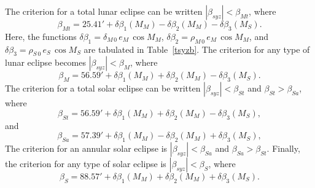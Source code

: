 The criterion for a total lunar eclipse can be written $|\beta_{syz}|< \beta_{Mt}$, where
\begin{equation}\label{elt}
\beta_{Mt} = 25.41' + \delta\beta_1(M_M)-\delta\beta_2 (M_M)-\delta\beta_3(M_S).\label{ae137}
\end{equation}
Here, the functions $\delta\beta_1=\delta_{M\,0}\,e_M\,\cos M_M$, $\delta\beta_2= \rho_{M\,0}\,e_M\,\cos M_M$, and $\delta\beta_3=\rho_{S\,0}\,e_S\,\cos M_S$
are tabulated in Table~\ref{tsyzb}. The criterion for any type of
lunar eclipse becomes $|\beta_{syz}|< \beta_{M}$, where
\begin{equation}\label{elp}
\beta_{M} = 56.59' +  \delta\beta_1(M_M)+\delta\beta_2 (M_M)-\delta\beta_3(M_S).
\end{equation}
The criterion for a total  solar eclipse can
be written $|\beta_{syz}|<\beta_{St}$ and $\beta_{St}>\beta_{Sa}$, where
\begin{equation}\label{est}
\beta_{St} = 56.59' +  \delta\beta_1(M_M)+\delta\beta_2 (M_M)-\delta\beta_3(M_S),
\end{equation}
and
\begin{equation}\label{esa}
\beta_{Sa} = 57.39' +  \delta\beta_1(M_M)-\delta\beta_2 (M_M)+\delta\beta_3(M_S),
\end{equation}
The criterion for an annular  solar eclipse is $|\beta_{syz}|<\beta_{Sa}$ and $\beta_{Sa}>\beta_{St}$.
Finally, 
the criterion for any
type of solar eclipse is $|\beta_{syz}|< \beta_{S}$, where
\begin{equation}\label{esp}
\beta_{S} = 88.57' +  \delta\beta_1(M_M)+\delta\beta_2 (M_M)+\delta\beta_3(M_S).\label{ae140}
\end{equation}



